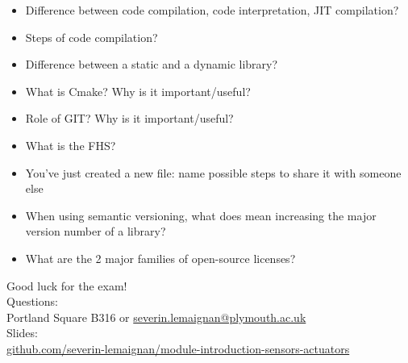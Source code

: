 \documentclass[compress]{beamer}
\begin{document}
\begin{frame}[plain]
    \begin{center}
        \begin{itemize}
        \item {Difference between code compilation, code interpretation, JIT compilation?}
        \item {Steps of code compilation?}
        \item {Difference between a static and a dynamic library?}
        \item {What is Cmake? Why is it important/useful?}
        \item {Role of GIT? Why is it important/useful?}
        \item {What is the FHS?}
        \item {You’ve just created a new file: name possible steps to share it with someone else}
        \item {When using semantic versioning, what does mean increasing the major version number of a library?}
        \item {What are the 2 major families of open-source licenses?}
        \end{itemize}
    \end{center}
\end{frame}


\begin{frame}{}
    \begin{center}
        \Large
        Good luck for the exam!\\[2em]
        \normalsize
        Questions:\\
        Portland Square B316 or \url{severin.lemaignan@plymouth.ac.uk} \\[1em]

        Slides:\\
        \href{https://github.com/severin-lemaignan/module-introduction-sensors-actuators}{\small
        github.com/severin-lemaignan/module-introduction-sensors-actuators}


    \end{center}
\end{frame}
\end{document}
